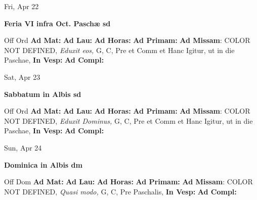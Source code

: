 \documentclass[10pt]{memoir}
\begin{document}
\begin{center}
\begin{minipage}{3.5in}
\vspace{2em}
\begin{center}Fri, Apr 22
\end{center}
\textbf{ \large Feria VI infra Oct. Paschæ
\textnormal{\normalsize sd}}

\begin{justify}Off Ord
\textbf{Ad Mat: }
\textbf{Ad Lau: }
\textbf{Ad Horas: }
\textbf{Ad Primam: }\textbf{Ad Missam}: COLOR NOT DEFINED, \textit{Eduxit eos,} G, C, Pre et Comm et Hanc Igitur, ut in die Paschae, 
\textbf{In Vesp: }
\textbf{Ad Compl: }
\end{justify}
\end{minipage}
\end{center}

\begin{center}
\begin{minipage}{3.5in}
\vspace{2em}
\begin{center}Sat, Apr 23
\end{center}
\textbf{ \large Sabbatum in Albis
\textnormal{\normalsize sd}}

\begin{justify}Off Ord
\textbf{Ad Mat: }
\textbf{Ad Lau: }
\textbf{Ad Horas: }
\textbf{Ad Primam: }\textbf{Ad Missam}: COLOR NOT DEFINED, \textit{Eduxit Dominus,} G, C, Pre et Comm et Hanc Igitur, ut in die Paschae, 
\textbf{In Vesp: }
\textbf{Ad Compl: }
\end{justify}
\end{minipage}
\end{center}

\begin{center}
\begin{minipage}{3.5in}
\vspace{2em}
\begin{center}Sun, Apr 24
\end{center}
\textbf{ \large Dominica in Albis
\textnormal{\normalsize dm}}

\begin{justify}Off Dom
\textbf{Ad Mat: }
\textbf{Ad Lau: }
\textbf{Ad Horas: }
\textbf{Ad Primam: }\textbf{Ad Missam}: COLOR NOT DEFINED, \textit{Quasi modo,} G, C, Pre Paschalis, 
\textbf{In Vesp: }
\textbf{Ad Compl: }
\end{justify}
\end{minipage}
\end{center}
\end{document}
